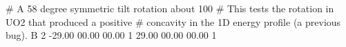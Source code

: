 # A 58 degree symmetric tilt rotation about 100
# This tests the rotation in UO2 that produced a positive
# concavity in the 1D energy profile (a previous bug).
B 2
-29.00 00.00 00.00 1
29.00 00.00 00.00 1
